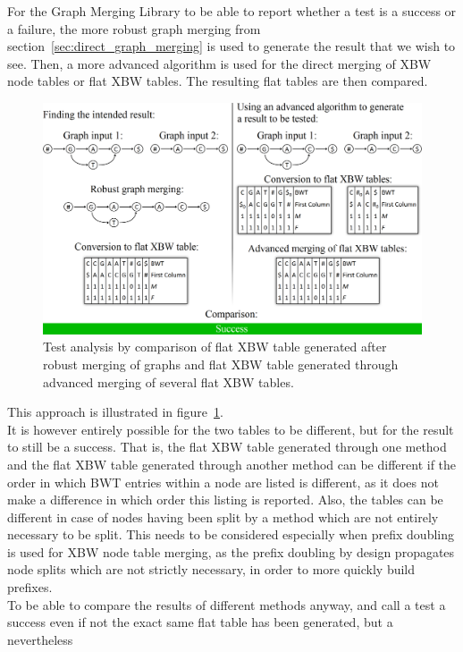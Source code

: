 \documentclass[a4paper,12pt,twoside,BCOR=10mm]{scrbook}
\begin{document}
For the Graph Merging Library to be able to report whether a test is a success or
a failure, the more robust graph merging from section~\ref{sec:direct_graph_merging}
is used to generate the result that we
wish to see. Then, a more advanced algorithm is used for the direct merging
of XBW node tables or flat XBW tables.
The resulting flat tables are then compared.
\begin{figure}[!htb]
\centering
\includegraphics[width=\textwidth]{evo_test_comparison.png}
\caption[Test analysis]{Test analysis by comparison of flat XBW table generated after robust merging of graphs and flat XBW table generated through advanced merging of several flat XBW tables.} \label{fig:evo_test_comparison}
\end{figure}
This approach is illustrated in figure~\ref{fig:evo_test_comparison}. \\
It is however entirely possible for the two tables to be different, but for the result to
still be a success. That is, the flat XBW table generated through one method and the
flat XBW table generated through another method can be different if the order in which BWT
entries within a node are listed is different, as it does not make a difference in which order
this listing is reported. Also, the tables can be different in case of nodes having been split
by a method which are not entirely necessary to be split.
This needs to be considered especially when prefix doubling is used for XBW node table merging,
as the prefix doubling by design propagates node splits which are not strictly necessary,
in order to more quickly build prefixes. \\
To be able to compare the results of different methods anyway, and call a test
a success even if not the exact same flat table has been generated, but a nevertheless
\end{document}
